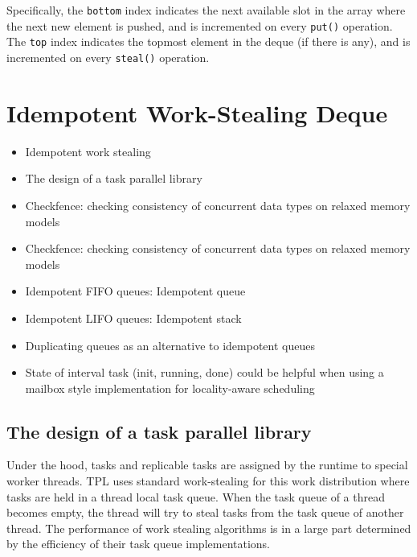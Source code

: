 Specifically, the \lstinline!bottom! index indicates the next
available slot in the array where the next new element is pushed, and
is incremented on every \lstinline!put()!  operation. The
\lstinline!top! index indicates the topmost element in the deque (if
there is any), and is incremented on every \lstinline!steal()!
operation.

\newpage
{}


\section{Idempotent Work-Stealing Deque}
\label{sec:queues-implementation-idempotent-ws-deque}



\begin{itemize}
\item Idempotent work stealing \cite{Michael2009}
\item The design of a task parallel library \cite{Leijen2009}
\item Checkfence: checking consistency of concurrent data types on
  relaxed memory models \cite{Burckhardt2007}
\item Checkfence: checking consistency of concurrent data types on
  relaxed memory models \cite{Burckhardt2007a}
\end{itemize}


\begin{itemize}
\item Idempotent FIFO queues: Idempotent queue
\item Idempotent LIFO queues: Idempotent stack
\item Duplicating queues as an alternative to idempotent queues
\item State of interval task (init, running, done) could be helpful
  when using a mailbox style implementation for locality-aware
  scheduling \cite{Acar2002}
\end{itemize}

\subsection{The design of a task parallel library \cite{Leijen2009}}

Under the hood, tasks and replicable tasks are assigned by the runtime
to special worker threads. TPL uses standard work-stealing for this
work distribution \cite{Frigo1998} where tasks are held in a thread
local task queue. When the task queue of a thread becomes empty, the
thread will try to steal tasks from the task queue of another
thread. The performance of work stealing algorithms is in a large part
determined by the efficiency of their task queue implementations.

